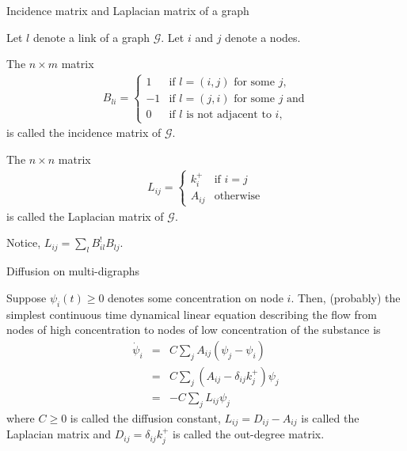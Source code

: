 \documentclass{beamer}
\begin{document}
\begin{frame}{Incidence matrix and Laplacian matrix of a graph}

Let $l$ denote a link of a graph $\mathcal{G}$.
Let $i$ and $j$ denote a nodes.

\vspace{0.25cm}

The $n\times m$ matrix
\begin{eqnarray}
B_{li}
=
\left\{
\begin{array}{ll}
1 & \mbox{if $l=(i,j)$ for some $j$,} \\
-1 & \mbox{if $l=(j,i)$ for some $j$ and} \\
0 & \mbox{if $l$ is not adjacent to $i$,}
\end{array}
\right.
\end{eqnarray}
is called the incidence matrix of $\mathcal{G}$.

\vspace{0.25cm}

The $n\times n$ matrix
\begin{eqnarray}
L_{ij}
=
\left\{
\begin{array}{ll}
k^+_i & \mbox{if $i=j$} \\
A_{ij} & \mbox{otherwise}
\end{array}
\right.
\end{eqnarray}
is called the Laplacian matrix of $\mathcal{G}$.

\vspace{0.25cm}

Notice,
$L_{ij} = \sum_l B^!_{il}B_{lj}$.

\end{frame}


\begin{frame}{Diffusion on multi-digraphs}

Suppose $\psi_i(t)\geq 0$ denotes some concentration on node $i$.
Then, (probably) the simplest continuous time dynamical linear equation describing the flow from nodes of high concentration to nodes of low concentration of the substance is
\begin{eqnarray}
\label{Xeq1}
\dot{\psi}_i
&=&
C
\sum_j
A_{ij}
(\psi_j-\psi_i)
\\
&=&
C\sum_j
(A_{ij}-\delta_{ij} k^+_j) 
\psi_j
\nonumber
\\
&=&
-
C
\sum_j
L_{ij}
\psi_j
\nonumber
\end{eqnarray}
where $C\geq 0$ is called the diffusion constant,  $L_{ij}=D_{ij}-A_{ij}$ 
is called the Laplacian matrix and
$D_{ij}=\delta_{ij} k^+_j$ 
is called the out-degree matrix.

\end{frame}
\end{document}
